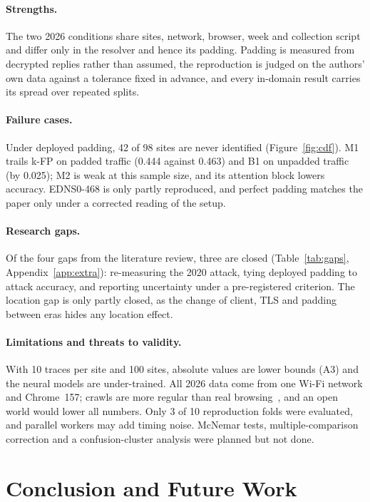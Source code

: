 \documentclass[pdflatex,sn-mathphys-num]{sn-jnl}
\begin{document}
\paragraph{Strengths.} The two 2026 conditions share sites, network, browser, week and collection script and differ only in the resolver and hence its padding. Padding is measured from decrypted replies rather than assumed, the reproduction is judged on the authors' own data against a tolerance fixed in advance, and every in-domain result carries its spread over repeated splits.

\paragraph{Failure cases.} Under deployed padding, 42 of 98 sites are never identified (Figure~\ref{fig:cdf}). M1 trails k-FP on padded traffic (0.444 against 0.463) and B1 on unpadded traffic (by 0.025); M2 is weak at this sample size, and its attention block lowers accuracy. EDNS0-468 is only partly reproduced, and perfect padding matches the paper only under a corrected reading of the setup.

\paragraph{Research gaps.} Of the four gaps from the literature review, three are closed (Table~\ref{tab:gaps}, Appendix~\ref{app:extra}): re-measuring the 2020 attack, tying deployed padding to attack accuracy, and reporting uncertainty under a pre-registered criterion. The location gap is only partly closed, as the change of client, TLS and padding between eras hides any location effect.

\paragraph{Limitations and threats to validity.} With 10 traces per site and 100 sites, absolute values are lower bounds (A3) and the neural models are under-trained. All 2026 data come from one Wi-Fi network and Chrome~157; crawls are more regular than real browsing~\cite{jansen2026gtt23,deng2026}, and an open world would lower all numbers. Only 3 of 10 reproduction folds were evaluated, and parallel workers may add timing noise. McNemar tests, multiple-comparison correction and a confusion-cluster analysis were planned but not done.

\section{Conclusion and Future Work}\label{sec:conclusion}
\end{document}
